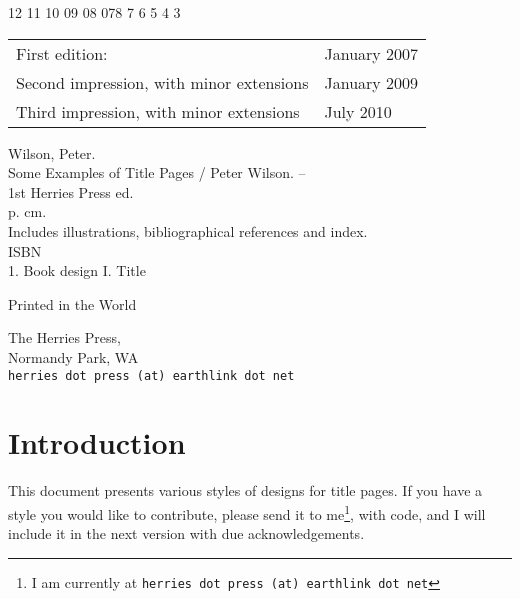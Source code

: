\documentclass{memoir}
\newcommand*{\plogo}{\fbox{$\mathcal{PL}$}}
\begin{document}
\begin{center}
 12 11 10 09 08 07\hspace{2em}8 7 6 5 4 3 %
\end{center}

\begin{center}
\begin{tabular}{ll}
First edition:  & January 2007 \\
Second impression, with minor extensions & January 2009 \\
Third impression, with minor extensions & July 2010 
\end{tabular}
\end{center}

\vfill

Wilson, Peter.\\
\hspace*{2em} Some Examples of Title Pages / Peter Wilson. -- \\
\hspace*{1em} 1st Herries Press ed. \\
\hspace*{2em} p. \hspace*{2em} cm. \\
\hspace*{2em} Includes illustrations, bibliographical references and index. \\
\hspace*{2em} ISBN \\
\hspace*{2em} 1. Book design \hspace*{2em} I. Title


\vfill

Printed in the World

The Herries Press, \\
Normandy Park, WA \\
\texttt{herries dot press (at) earthlink dot net}

\vspace*{2\baselineskip}


\endgroup
\clearpage
\pagestyle{plain}

\tableofcontents
\cleardoublepage
\mainmatter

\chapter{Introduction}

    This document presents various styles of designs for 
title pages.
If you have a style you would like to contribute, please send it to 
me\footnote{I am currently at \texttt{herries dot press (at) earthlink dot net}},
with code, and I will include it in the next version with due acknowledgements.
\end{document}
